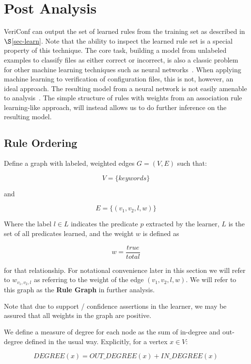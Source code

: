 
\section{Post Analysis}

VeriConf can output the set of learned rules from the training set as described in $\S$\ref{sec-learn}.
Note that the ability to inspect the learned rule set is a special property of this technique.
The core task, building a model from unlabeled examples to classify files as either correct or incorrect, is also a classic problem for other machine learning techniques such as neural networks~\cite{nn1,nn2,nn3}.
When applying machine learning to verification of configuration files, this is not, however, an ideal approach.
The resulting model from a neural network is not easily amenable to analysis~\cite{nnAnalysis1,nnAnalysis2}.
The simple structure of rules with weights from an association rule learning-like approach, will instead allows us to do further inference on the resulting model.

\subsection{Rule Ordering}
\label{sec:ruleorder}

Define a graph with labeled, weighted edges $G = (V,E)$ such that:

    $$V = \{ keywords \}$$

and 

    $$E = \{ (v_1, v_2, l, w) \}$$

Where the label $l \in L$ indicates the predicate $p$ extracted by the learner,
$L$ is the set of all predicates learned,
and the weight $w$ is defined as 

    $$w = \frac{true}{total}$$

for that relationship. For notational convenience later in this section
we will refer to $w_{v_1, v_2, l}$ as referring to the weight of the
edge $(v_1, v_2, l, w)$. We will refer to this graph as the {\bf Rule Graph}
in further analysis.

Note that due to support / confidence assertions in the learner, we
may be assured that all weights in the graph are positive.

We define a measure of degree for each node as the sum of in-degree
and out-degree defined in the usual way. Explicitly, for a vertex $x \in V$:

    $$DEGREE(x) = OUT\_DEGREE(x) + IN\_DEGREE(x)$$

